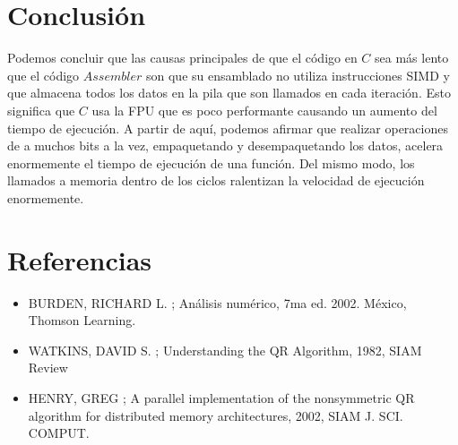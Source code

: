 \documentclass[10pt, a4paper]{article}
\begin{document}
\section{Conclusi\'on}
Podemos concluir que las causas principales de que el código en $C$ sea más lento que el código $Assembler$ son que su ensamblado no utiliza instrucciones SIMD y que almacena todos los datos en la pila que son llamados en cada iteración. Esto significa que $C$ usa la FPU que es poco performante causando un aumento del tiempo de ejecución.\newline
A partir de aquí, podemos afirmar que realizar operaciones de a muchos bits a la vez, empaquetando y desempaquetando los datos, acelera enormemente el tiempo de ejecución de una función. Del mismo modo, los llamados a memoria dentro de los ciclos ralentizan la velocidad de ejecución enormemente.

\section{Referencias}
\begin{itemize}
\item BURDEN, RICHARD L. ; An\'alisis num\'erico, 7ma ed. 2002. M\'exico, Thomson Learning.
\item WATKINS, DAVID S. ; Understanding the QR Algorithm, 1982, SIAM Review
\item HENRY, GREG ; A parallel implementation of the nonsymmetric QR algorithm for distributed memory architectures, 2002, SIAM J. SCI. COMPUT.
\end{itemize}

\newpage
\end{document}
